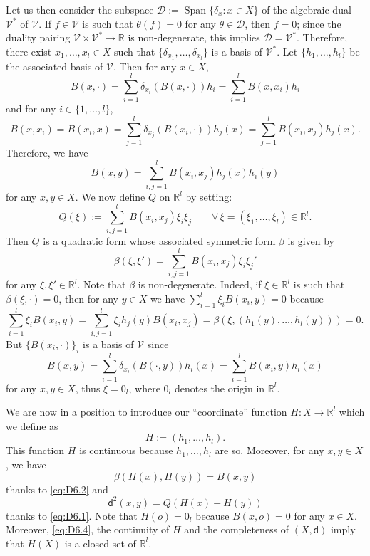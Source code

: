 \documentclass[JEP,XML,SOM,Unicode,published]{cedram}
\theoremstyle{plain}
\theoremstyle{definition}
\newcommand{\setR}{\mathbb{R}}
\newcommand{\cV}{\mathcal{V}}
\newcommand{\cD}{\mathcal{D}}
\newcommand{\dist}{\mathsf{d}}
\DeclareMathOperator{\Span}{Span}
\begin{document}
Let us then consider the subspace $\mathcal{D}:=\Span\{\delta_x: x \in X\}$ of the algebraic dual~$\cV^*$ of $\cV$. If $f \in \cV$ is such that $\theta(f)=0$ for any $\theta \in \cD$, then $f=0$; since the duality pairing $\cV\times\cV^* \to\setR$ is non-degenerate, this implies $\cD = \cV^*$. Therefore, there exist $x_1,\dots, x_l \in X$ such that $\{\delta_{x_1},\dots,\delta_{x_l}\}$ is a basis of $\mathcal{V}^*$. Let $\{h_1,\dots,h_l\}$ be the associated basis of $\mathcal{V}$. Then for any $x \in X$,
\begin{equation}\label{eq:basis}
B(x,\cdot) = \sum_{i=1}^l \delta_{x_i}(B(x,\cdot)) h_i = \sum_{i=1}^l B(x,x_i) h_i
\end{equation}
and for any $i \in \{1,\dots,l\}$,
\[
B(x,x_i) = B(x_i,x) = \sum_{j=1}^l \delta_{x_j}(B(x_i,\cdot)) h_j(x)= \sum_{j=1}^l B(x_i,x_j)h_j(x).
\]
Therefore, we have
\begin{equation}\label{eq:D6.2}
B(x,y) = \sum_{i,j=1}^l B(x_i,x_j)h_j(x)h_i(y)
\end{equation}
for any $x,y \in X$. We now define $Q$ on $\setR^l$ by setting:
\[
Q(\xi):= \sum_{i,j=1}^lB(x_i,x_j)\xi_i \xi_j \qquad \forall \, \xi=(\xi_1,\dots,\xi_l) \in \setR^l.
\]
Then $Q$ is a quadratic form whose associated symmetric form $\beta$ is given by
\[
\beta(\xi,\xi') = \sum_{i,j=1}^l B(x_i,x_j)\xi_i \xi_j'
\]
for any $\xi, \xi' \in \setR^l$. Note that $\beta$ is non-degenerate. Indeed, if $\xi \in \setR^l $ is such that $\beta(\xi,\cdot)=0$, then for any $y \in X$ we have $\sum_{i=1}^l \xi_i B(x_i,y)=0$ because
\[
\sum_{i=1}^l \xi_i B(x_i,y)=\sum_{i,j=1}^l \xi_i h_j(y)B(x_i,x_j)=\beta(\xi,(h_1(y),\ldots,h_l(y)))=0.
\]
But $\{B(x_i,\cdot)\}_i$ is a basis of $\cV$ since
\[
B(x,y)=\sum_{i=1}^l \delta_{x_i}(B(\cdot,y))h_i(x)= \sum_{i=1}^l B(x_i,y)h_i(x)
\]
for any $x,y \in X$, thus $\xi=0_l$, where $0_l$ denotes the origin in $\setR^l$.

We are now in a position to introduce our ``coordinate'' function $H:X\to\setR^l$ which we define as
\[
H:=(h_1,\dots,h_l).
\]
This function $H$ is continuous because $h_1,\dots,h_l$ are so. Moreover, for any $x,y \in X$, we have
\begin{equation}\label{eq:D6.3}
\beta(H(x),H(y)) = B(x,y)
\end{equation}
thanks to \eqref{eq:D6.2} and
\begin{equation}\label{eq:D6.4}
\dist^2(x,y) = Q(H(x)-H(y))
\end{equation}
thanks to \eqref{eq:D6.1}. Note that $H(o)=0_l$ because $B(x,o)=0$ for any $x \in X$. Moreover, \eqref{eq:D6.4}, the continuity of $H$ and the completeness of $(X,\dist)$ imply that $H(X)$ is a closed set of $\setR^l$.
\end{document}
